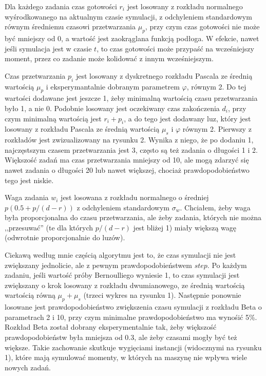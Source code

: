 \documentclass[11pt]{article}
\begin{document}
Dla każdego zadania czas gotowości $r_i$ jest losowany z rozkładu normalnego wyśrodkowanego na aktualnym czasie symulacji, z odchyleniem standardowym równym średniemu czasowi przetwarzania $\mu_p$, przy czym czas gotowości nie może być mniejszy od 0, a wartość jest zaokrąglana funkcją podłoga. W efekcie, nawet jeśli symulacja jest w czasie $t$, to czas gotowości może przypaść na wcześniejszy moment, przez co zadanie może kolidować z innym wcześniejszym. 

Czas przetwarzania $p_i$ jest losowany z dyskretnego rozkładu Pascala ze średnią wartością $\mu_p$ i eksperymantalnie dobranym parametrem $\varphi$, równym 2. Do tej wartości dodawane jest jeszcze 1, żeby minimalną wartością czasu przetwarzania było 1, a nie 0. Podobnie losowany jest oczekiwany czas zakończenia $d_i$, przy czym minimalną wartością jest $r_i + p_i$, a do tego jest dodawany luz, który jest losowany z rozkładu Pascala ze średnią wartością $\mu_s$ i $\varphi$ równym 2. Pierwszy z rozkładów jest zwizualizowany na rysunku 2. Wynika z niego, że po dodaniu 1, najczęstszym czasem przetwarzania jest 3, często są też zadania o długości 1 i 2. Większość zadań ma czas przetwarzania mniejszy od 10, ale mogą zdarzyć się nawet zadania o długości 20 lub nawet większej, chociaż prawdopodobieństwo tego jest niskie.

Waga zadania $w_i$ jest losowana z rozkładu normalnego o średniej $p(0.5 + p/(d - r))$ z odchyleniem standardowym $\sigma_w$. Chciałem, żeby waga była proporcjonalna do czasu przetwarzania, ale żeby zadania, których nie można ,,przesuwać'' (te dla których $p/(d - r)$ jest bliżej 1) miały większą wagę (odwrotnie proporcjonalnie do luzów).

Ciekawą według mnie częścią algorytmu jest to, że czas symulacji nie jest zwiększany jednolicie, ale z pewnym prawdopodobieństwem $step$. Po każdym zadaniu, jeśli wartość próby Bernoulliego wyniesie 1, to czas symulacji jest zwiększany o krok losowany z rozkładu dwumianowego, ze średnią wartością wartością równą $\mu_p + \mu_s$ (trzeci wykres na rysunku 1). Następnie ponownie losowane jest prawdopodobieństwo zwiększenia czasu symulacji z rozkładu Beta o parametrach 2 i 10, przy czym minimalne prawdopodobieństwo ma wynośić 5\%. Rozkład Beta został dobrany eksperymentalnie tak, żeby większość prawdopodobieństw była mniejsza od 0.3, ale żeby czasami mogły być też większe. Takie zachowanie skutkuje wygięciami instancji (widocznymi na rysunku 1), które mają symulować momenty, w których na maszynę nie wpływa wiele nowych zadań.
\end{document}
